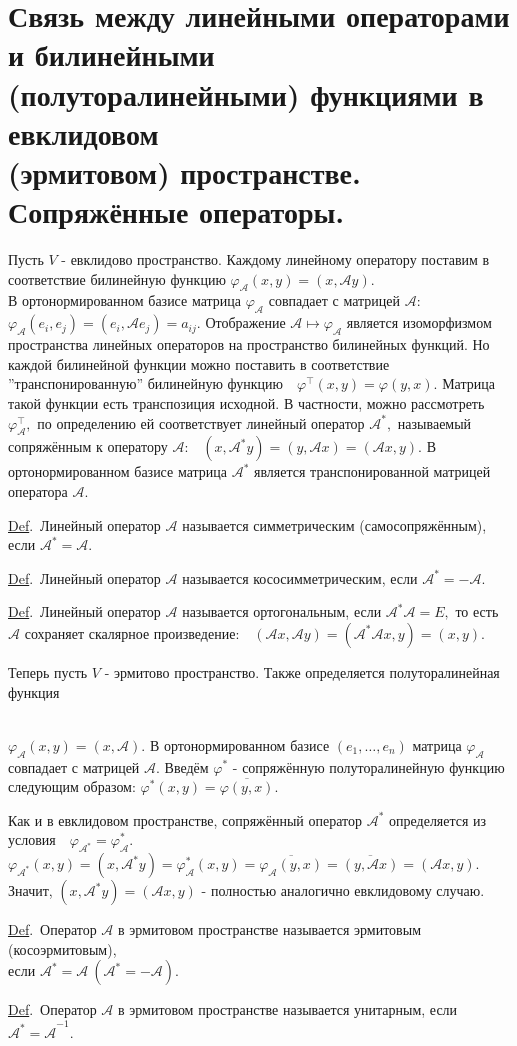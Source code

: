 \documentclass[a4paper]{article}%
\renewcommand{\de}{\par\noindent\underline{Def}.\ }%
\renewcommand{\ab}{\par\noindent}%
\renewcommand{\phi}{\varphi}
\newcommand{\baz}[1]{\left(#1_1,\dots,#1_n\right)}%
\newcommand{\op}[1]{$\mathcal{#1}$}
\renewcommand{\om}[1]{\mathcal{#1}}
\begin{document}
\section{Связь между линейными операторами и билинейными\\ (полуторалинейными) функциями в евклидовом\\
(эрмитовом) пространстве. Сопряжённые операторы.} %
\label{q28} %
Пусть $V$ - евклидово пространство. Каждому линейному оператору поставим в соответствие билинейную функцию
$\phi_{\om{A}}(x,y)=(x,\om{A}y).$\\ В ортонормированном базисе матрица $\phi_{\om{A}}$ совпадает с матрицей
$\om{A}$: $\phi_{\om{A}}(e_i,e_j)=(e_i,\om{A}e_j)=a_{ij}.$ %
Отображение $\om{A}\mapsto\phi_{\om{A}}$ является изоморфизмом пространства линейных операторов на пространство
билинейных функций. Но каждой билинейной функции можно поставить в соответствие ''транспонированную''
билинейную функцию\ \ $\phi^\top(x,y)=\phi(y,x).$ Матрица такой функции есть транспозиция исходной. В
частности, можно рассмотреть $\phi_{\om{A}}^\top,$ по определению ей соответствует линейный оператор $\om{A}^*,$
называемый сопряжённым к оператору \op{A}:\ \  $(x,\om{A}^*y)=(y,\om{A}x)=(\om{A}x,y).$ В ортонормированном
базисе матрица \op{A^*} является транспонированной матрицей оператора \op{A}. %
\de Линейный оператор $\om{A}$ называется симметрическим (самосопряжённым), если $\om{A^*=A}.$ %
\de Линейный оператор $\om{A}$ называется кососимметрическим, если $\om{A^*=-A}.$ %
\de Линейный оператор $\om{A}$ называется ортогональным, если $\om{A^*A}=E,$ то есть $\om{A}$ сохраняет
скалярное произведение:\ \ $(\om{A}x,\om{A}y)=(\om{A^*A}x,y)=(x,y).$ %
\ab Теперь пусть $V$ - эрмитово пространство. Также определяется полуторалинейная функция \rule{0pt}{15pt}\\
$\phi_{\om{A}}(x,y)=(x,\om{A}).$ В ортонормированном базисе $\baz{e}$ матрица $\phi_{\om{A}}$ совпадает с матрицей
$\om{A}$. Введём $\phi^*$ - сопряжённую полуторалинейную функцию следующим образом:
$\phi^*(x,y)=\overline{\phi(y,x)}.$ %
\ab Как и в евклидовом пространстве, сопряжённый оператор \op{A^*} определяется из условия\ \
$\phi_{\om{A^*}}=\phi^*_{\om{A}}.$
$\phi_{\om{A^*}}(x,y)=(x,\om{A^*}y)=\phi^*_{\om{A}}(x,y)=\overline{\phi_{\om{A}}(y,x)}=\overline{(y,\om{A}x)}=(\om{A}x,y).$
\\Значит, $(x,\om{A^*}y)=(\om{A}x,y)$ - полностью аналогично евклидовому случаю.
\de Оператор $\om{A}$ в эрмитовом пространстве называется эрмитовым (косоэрмитовым),\\ если $\om{A^*=A}\
(\om{A^*=-A}).$ %
\de Оператор \op{A} в эрмитовом пространстве называется унитарным, если $\om{A^*=A}^{-1}.$
\end{document}
